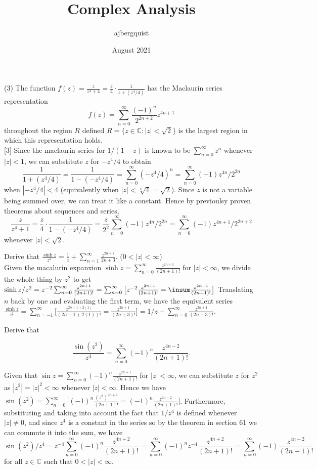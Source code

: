 \documentclass{article}
\title{Complex Analysis}
\author{ajbergquist }
\date{August 2021}
\theoremstyle{definition}
\newcommand{\C}{\mathbb{C}}
\newcommand{\infsum}{\sum_{n = 0}^{\infty}}
\newcommand{\pf}{\fbox{proof}}
\newcommand{\prop}{\fbox{proposition}}
\newcommand{\cs}[1]{\color{blue}{#1}\normalcolor}
\begin{document}
\cs{Sec. 65}

\prop (3) The function $f(z) = \frac{z}{z^4 + 4} = \frac{z}{4}\cdot\frac{1}{z+(z^4/4)}$ has the Maclaurin series representation 
$$f(z) = \infsum \frac{(-1)^n}{2^{2n + 2}}z^{4n + 1}$$ throughout the region $R$ defined $R = \{z\in \C:|z|<\sqrt{2}\}$ is the largest region in which this representation holds.\\

\pf[3] Since the maclaurin series for $1/(1-z)$ is known to be $\infsum z^n$ whenever $|z| < 1$, we can substitute $z$ for $-z^4/4$ \cs{substitute $-z^4/4$ for $z$} to obtain $$
\frac{1}{1+(z^4/4)} = \frac{1}{1-(-z^4/4)} = \infsum (-z^4/4)^n = \infsum (-1)z^{4n}/2^{2n}$$ when $|-z^4/4| < 4$ \cs{Do you mean $<1$?} (equivalently when $|z|< \sqrt[4]{4} = \sqrt{2}$). Since $z$ is not a variable being summed over, we can treat it like a constant. Hence by previoulsy proven theorems about sequences and series, 
$$\frac{z}{z^4 + 1} = \frac{z}{4}\cdot \frac{1}{1-(-z^4/4)} = \frac{z}{2^2}\infsum (-1)z^{4n}/2^{2n} = \infsum (-1)z^{4n+1}/2^{2n+2}$$ whenever $|z|< \sqrt{2}.$\\

\cs{5/5}


 Derive that $\frac{\sinh z}{z^2} = \frac{1}{z} +\sum_{n = 1}^\infty \frac{z^{2n+1}}{2n+3}$. ($0 < |z|<\infty$)\\

 Given the macalurin expanxion $\sinh z = \infsum \frac{z^{2n+1}}{(2n+1)!}$ for $|z| < \infty$, we divide the whole thing by $z^2$ to get $\sinh z / z^2 = z^{-2}\infsum \frac{z^{2n+1}}{(2n+1)!} = \infsum \big[z^{-2}\frac{z^{2n+1}}{(2n+1)!} = \insum \frac{z^{2n - 1}}{(2n+ 1)!}\big]$ Translating $n$ back by one and evaluating the first term, we have the equivalent series $\frac{\sinh z}{z^2} = \sum_{n = -1}^\infty \big[\frac{z^{2n-1+2(1)}}{(2n+1+2(1))!} = \frac{z^{2n+1}}{(2n+3)!}\big] = 1/z + \infsum\frac{z^{2n+1}}{(2n+3)!}$.\\

\cs{5/5}

 Derive that 

$$\frac{\sin(z^2)}{z^4} =  \infsum (-1)^n\frac{z^{4n-2}}{(2n+1)!}.$$

 Given that $\sin z = \infsum (-1)^n\frac{z^{2n+1}}{(2n+1)!}$ for $|z|<\infty$, we can substitute $z$ for $z^2$ \cs{substitute $z^2$ for $z$} as $|z^2| = |z|^2<\infty$ whenever $|z|<\infty$. Hence we have $\sin(z^2) = \infsum \big[(-1)^n\frac{(z^2)^{2n+1}}{(2n+1)!} = (-1)^n\frac{z^{4n-2}}{(2n+1)!}\big]$. \cs{Should that be $4n+2$?} Furthermore, substituting and taking into account the fact that $1/z^4$ is defined whenever $|z| \ne 0$, and since $z^4$ is a constant in the series so by the theorem in section 61 we can commute it into the sum, we have 
$$\sin(z^2)/z^4 = z^{-4}\infsum(-1)^n\frac{z^{4n+2}}{(2n+1)!} = \infsum(-1)^nz^{-4}\frac{z^{4n+2}}{(2n+1)!}  = \infsum(-1)\frac{z^{4n-2}}{(2n+1)!}$$ for all $z\in \C$ such that $0 < |z| < \infty$.

\cs{5/5}

\cs{15/15}
\end{document}

